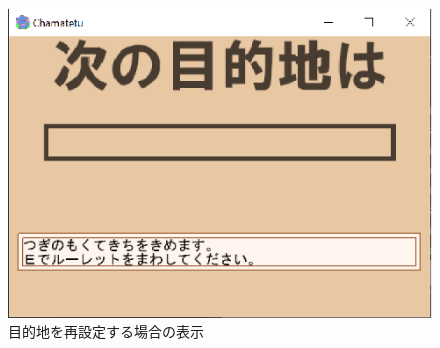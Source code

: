 \documentclass[a4j]{jarticle}
\begin{document}
        \begin{figure}[H]
            \centering
            \includegraphics[scale=1.3]{distflg1.eps}
            \caption{目的地を再設定する場合の表示}
             \label{dist2}
            \end{figure} 
\end{document}
